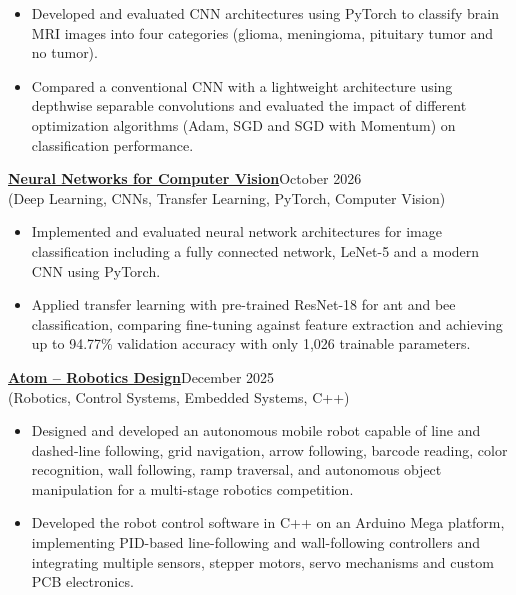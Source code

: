 \documentclass[10pt,a4paper]{article}
\begin{document}
\begin{itemize}
    \item Developed and evaluated CNN architectures using PyTorch to classify brain MRI images into four categories (glioma, meningioma, pituitary tumor and no tumor).
    \item Compared a conventional CNN with a lightweight architecture using depthwise separable convolutions and evaluated the impact of different optimization algorithms (Adam, SGD and SGD with Momentum) on classification performance.
\end{itemize}


\vspace{0.3cm}
\href{https://github.com/TharushaNimesh22/Neural-Networks-for-Computer-Vision}{\textbf{Neural Networks for Computer Vision}}\hfill October 2026 \\
(Deep Learning, CNNs, Transfer Learning, PyTorch, Computer Vision)

\begin{itemize}
    \item Implemented and evaluated neural network architectures for image classification including a fully connected network, LeNet-5 and a modern CNN using PyTorch.
    \item Applied transfer learning with pre-trained ResNet-18 for ant and bee classification, comparing fine-tuning against feature extraction and achieving up to 94.77\% validation accuracy with only 1,026 trainable parameters.
\end{itemize}



\vspace{0.3cm}
\href{https://github.com/TharushaNimesh22/Atom-Robotics-Design}{\textbf{Atom -- Robotics Design}}\hfill December 2025\\
(Robotics, Control Systems, Embedded Systems, C++)

\begin{itemize}
    \item Designed and developed an autonomous mobile robot capable of line and dashed-line following, grid navigation, arrow following, barcode reading, color recognition, wall following, ramp traversal, and autonomous object manipulation for a multi-stage robotics competition.
    \item Developed the robot control software in C++ on an Arduino Mega platform, implementing PID-based line-following and wall-following controllers and integrating multiple sensors, stepper motors, servo mechanisms and custom PCB electronics.
\end{itemize}
\end{document}
